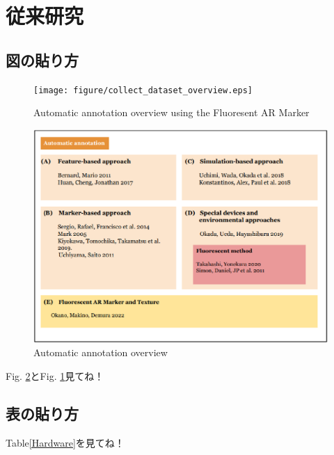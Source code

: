\section{従来研究}
\subsection{図の貼り方}

\begin{figure}[b]
\begin{center}
\texttt{[image: figure/collect\_dataset\_overview.eps]}
\caption{Automatic annotation overview using the Fluoresent AR Marker}
\label{Automatic annotation overview using a Fluoresent AR marker}
\end{center}
\end{figure}

\begin{figure}[t]
\begin{center}
\includegraphics[width=160mm,clip]{figure/related_overview.eps}
\caption{Automatic annotation overview}
\label{Automatic annotation overview}
\end{center}
\end{figure}

Fig. \ref{Automatic annotation overview}とFig. \ref{Automatic annotation overview using a Fluoresent AR marker}見てね！

\subsection{表の貼り方}
Table\ref{Hardware}を見てね！

